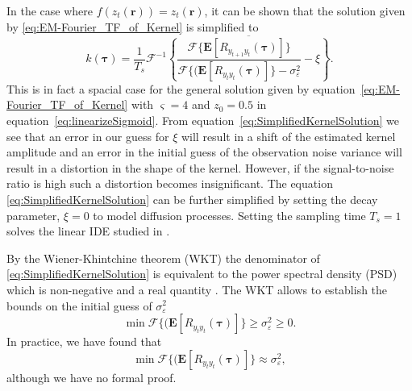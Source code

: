 \documentclass[10pt,twocolumn,twoside]{IEEEtran}
\newcommand{\parham}[1]{\textsf{\emph{\textbf{\textcolor{blue}{#1}}}}}
\begin{document}
In the case where $f(z_t(\mathbf{r}))=z_t(\mathbf{r})$, it can be shown that the solution given by \eqref{eq:EM-Fourier_TF_of_Kernel} is simplified to  
\begin{equation}\label{eq:SimplifiedKernelSolution}
	k(\boldsymbol\tau) = \frac{1}{T_s }\mathcal{F}^{-1}\overline{\left\{\frac{\mathcal{F}\{\mathbf{E}[R_{y_{t+1}y_t}(\boldsymbol{\tau})]\}}{\mathcal{F}\{(\mathbf{E}\left[R_{y_ty_t}(\boldsymbol\tau)\right]\} - \sigma_{\varepsilon}^2 }-\xi\right\}}.
\end{equation}
This is in fact a spacial case for the general solution given by equation~\eqref{eq:EM-Fourier_TF_of_Kernel} with $\varsigma=4$ and $z_0=0.5$ in equation~\eqref{eq:linearizeSigmoid}. From equation~\eqref{eq:SimplifiedKernelSolution} we see that an error in our guess for $\xi$ will result in a shift of the estimated kernel amplitude and an error in the initial guess of the observation noise variance will result in a distortion in the shape of the kernel. However, if the signal-to-noise ratio is high such a distortion becomes insignificant. The equation \eqref{eq:SimplifiedKernelSolution} can be further simplified by setting the decay parameter, $\xi=0$ to model diffusion processes. Setting the sampling time $T_s=1$ solves the linear IDE studied in \cite{Dewar2009, Scerri2009}.  

By the Wiener-Khintchine theorem (WKT) the denominator of \eqref{eq:SimplifiedKernelSolution} is equivalent to the power spectral density (PSD) which is non-negative and a real quantity \cite{Ricker2003}. The WKT allows to establish the bounds on the initial guess of $\sigma_{\varepsilon}^2$
\begin{equation}\label{eq:BoundOnObsVariance}   
  \min\mathcal{F}\{(\mathbf{E}\left[R_{y_ty_t}(\boldsymbol\tau)\right]\}\ge\sigma_{\varepsilon}^2\ge0. 
\end{equation}
In practice, we have found that 
\begin{equation}
	\min\mathcal{F}\{(\mathbf{E}\left[R_{y_ty_t}(\boldsymbol\tau)\right]\}\approx\sigma_{\varepsilon}^2,
\end{equation}
although we have no formal proof.
\end{document}
